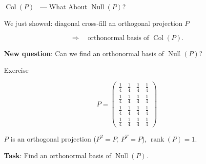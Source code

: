\documentclass[10pt]{beamer}
\theoremstyle{definition}
\newcommand{\x}[1]{\alert{\textbf{#1}}}
\begin{document}

\begin{frame}{$\operatorname{Col}(P)$ \checkmark\ --- What About $\operatorname{Null}(P)$?}

We just showed: diagonal cross-fill an orthogonal projection $P$

$$\Longrightarrow \quad \text{orthonormal basis of } \operatorname{Col}(P).$$

\vspace{0.5em}

\x{New question}: Can we find an orthonormal basis of $\operatorname{Null}(P)$?

\end{frame}

\begin{frame}{Exercise}

$$P = \begin{pmatrix} \frac{1}{4} & \frac{1}{4} & \frac{1}{4} & \frac{1}{4} \\[3pt] \frac{1}{4} & \frac{1}{4} & \frac{1}{4} & \frac{1}{4} \\[3pt] \frac{1}{4} & \frac{1}{4} & \frac{1}{4} & \frac{1}{4} \\[3pt] \frac{1}{4} & \frac{1}{4} & \frac{1}{4} & \frac{1}{4} \end{pmatrix}$$

$P$ is an orthogonal projection ($P^2 = P$, $P^T = P$), $\operatorname{rank}(P) = 1$.

\vspace{0.5em}

\x{Task}: Find an orthonormal basis of $\operatorname{Null}(P)$.

\end{frame}
\end{document}
